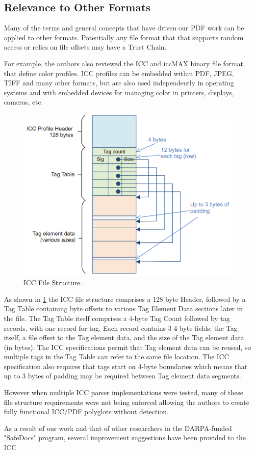 \subsection{Relevance to Other Formats }
\label{sec:other-formats}

Many of the terms and general concepts that have driven our PDF work
can be applied to other formats. Potentially any file format that that supports random access or relies on file offsets may have a Trust Chain.

For example, the authors also reviewed the ICC \cite{isotc130jwg7ISO15076120102010} and 
iccMAX \cite{iccSpecificationICC20192019} binary file format that define color profiles.
ICC profiles can be embedded within PDF, JPEG, TIFF and many other formats, but are also 
used independently in operating systems and with embedded devices for managing color in 
printers, displays, cameras, etc.

\begin{figure}[t]
    \centering
    \includegraphics[width=0.85\linewidth]{figures/icc.png}
    \caption{ICC File Structure.}
    \label{fig:icc-structure}
\end{figure}

As shown in \cref{fig:icc-structure} the ICC file structure comprises a 128 byte Header, followed by a 
Tag Table containing byte offsets to various Tag Element Data sections later in the file. 
The Tag Table itself comprises a 4-byte Tag Count followed by tag records, with one record for tag. 
Each record contains 3 4-byte fields: the Tag itself, a file offset to the Tag element data, and the size of the Tag element data (in bytes).
The ICC specifications permit that Tag element data can be reused, so multiple tags in the Tag Table can
refer to the same file location. The ICC specification also requires that tags start on 4-byte boundaries
which means that up to 3 bytes of padding may be required between Tag element data segments.

However when multiple ICC parser implementations were tested, many of these file structure requirements
were not being enforced allowing the authors to create fully functional ICC/PDF polyglots 
without detection.

As a result of our work and that of other researchers in the DARPA-funded "SafeDocs" program, several
improvement suggestions have been provided to the ICC 
